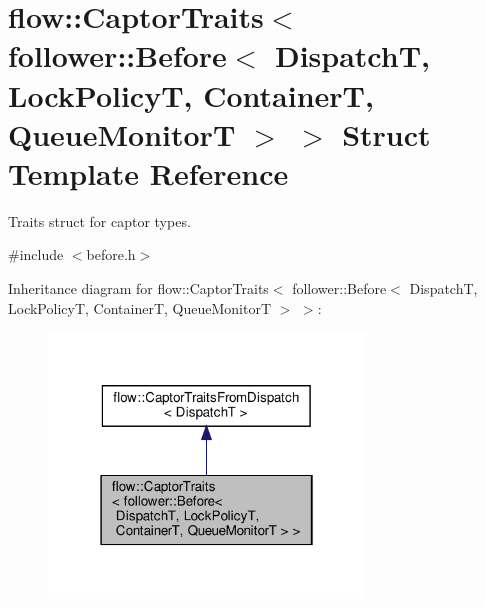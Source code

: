 \hypertarget{structflow_1_1_captor_traits_3_01follower_1_1_before_3_01_dispatch_t_00_01_lock_policy_t_00_01_c62c65191d3908e10afd70708af893571}{}\section{flow\+:\+:Captor\+Traits$<$ follower\+:\+:Before$<$ DispatchT, Lock\+PolicyT, ContainerT, Queue\+MonitorT $>$ $>$ Struct Template Reference}
\label{structflow_1_1_captor_traits_3_01follower_1_1_before_3_01_dispatch_t_00_01_lock_policy_t_00_01_c62c65191d3908e10afd70708af893571}


Traits struct for captor types.  




{\ttfamily \#include $<$before.\+h$>$}



Inheritance diagram for flow\+:\+:Captor\+Traits$<$ follower\+:\+:Before$<$ DispatchT, Lock\+PolicyT, ContainerT, Queue\+MonitorT $>$ $>$\+:
\nopagebreak
\begin{figure}[H]
\begin{center}
\leavevmode
\includegraphics[width=238pt]{structflow_1_1_captor_traits_3_01follower_1_1_before_3_01_dispatch_t_00_01_lock_policy_t_00_01_c88d620e0eba9fa591fae29acc81fecf6}
\end{center}
\end{figure}


